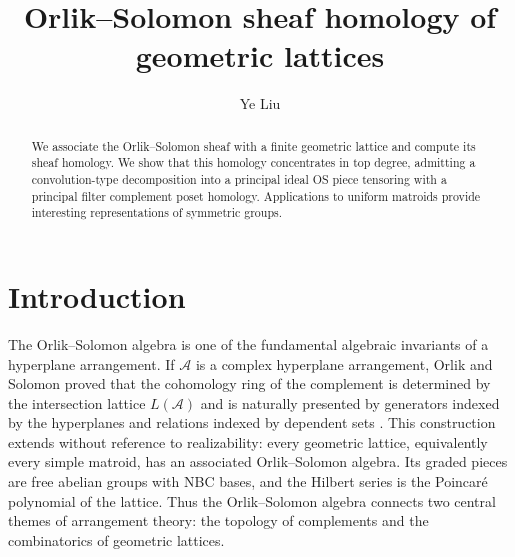 \documentclass{amsart}
\numberwithin{equation}{section}
\theoremstyle{plain}
\theoremstyle{remark}
\theoremstyle{definition}
\numberwithin{equation}{section}
\newcommand{\A}{\mathcal{A}}
\begin{document}
\title{Orlik--Solomon sheaf homology of geometric lattices}



\author{Ye Liu}
\address{Department of Pure Mathematics, Xi'an Jiaotong-Liverpool University, Suzhou, Jiangsu 215123, P. R. China}





\date{}



\begin{abstract}
We associate the Orlik--Solomon sheaf with a finite geometric lattice and compute its sheaf homology. We show that this homology concentrates in top degree, admitting a convolution-type decomposition into a principal ideal OS piece tensoring with a principal filter complement poset homology. Applications to uniform matroids provide interesting representations of symmetric groups.
\end{abstract}

\maketitle

\tableofcontents


\section{Introduction}

The Orlik--Solomon algebra is one of the fundamental algebraic invariants of a hyperplane arrangement.  If $\A$ is a complex hyperplane arrangement, Orlik and Solomon proved that the cohomology ring of the complement is determined by the intersection lattice $L(\A)$ and is naturally presented by generators indexed by the hyperplanes and relations indexed by dependent sets \cite{Orlik1980}.  This construction extends without reference to realizability: every geometric lattice, equivalently every simple matroid, has an associated Orlik--Solomon algebra.  Its graded pieces are free abelian groups with NBC bases, and the Hilbert series is the Poincar\'e polynomial of the lattice. Thus the Orlik--Solomon algebra connects two central themes of arrangement theory: the topology of complements and the combinatorics of geometric lattices.
\end{document}
